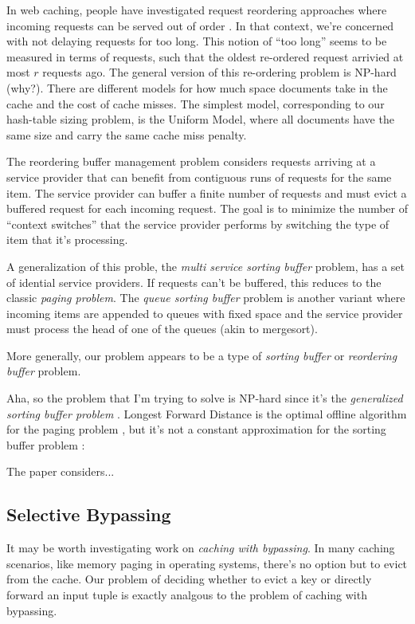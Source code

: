\documentclass[12pt]{article}
\begin{document}
In web caching, people have investigated request reordering approaches where incoming requests can be served out of order \cite{web-caching-new-results}.  In that context, we're concerned with not delaying requests for too long.  This notion of ``too long'' seems to be measured in terms of requests, such that the oldest re-ordered request arrivied at most $r$ requests ago.  The general version of this re-ordering problem is NP-hard (why?).  There are different models for how much space documents take in the cache and the cost of cache misses.  The simplest model, corresponding to our hash-table sizing problem, is the Uniform Model, where all documents have the same size and carry the same cache miss penalty.

The reordering buffer management problem \cite{online-scheduling-for-sorting-buffers} considers requests arriving at a service provider that can benefit from contiguous runs of requests for the same item.  The service provider can buffer a finite number of requests and must evict a buffered request for each incoming request.  The goal is to minimize the number of ``context switches'' that the service provider performs by switching the type of item that it's processing.

A generalization of this proble, the \emph{multi service sorting buffer} problem, has a set of idential service providers.  If requests can't be buffered, this reduces to the classic \emph{paging problem}.  The \emph{queue sorting buffer} problem is another variant where incoming items are appended to queues with fixed space and the service provider must process the head of one of the queues (akin to mergesort).

More generally, our problem appears to be a type of \emph{sorting buffer} or \emph{reordering buffer} problem.

Aha, so the problem that I'm trying to solve is NP-hard since it's the \emph{generalized sorting buffer problem} \cite{sorting-buffer-np-hardness}.
Longest Forward Distance is the optimal offline algorithm for the paging problem \cite{lfd}, but it's not a constant approximation for the sorting buffer problem \cite{sorting-buffer-np-hardness}:

The paper \cite{competitive-reordering-algorithm} considers...



\subsection{Selective Bypassing}
It may be worth investigating work on \emph{caching with bypassing}.  In many caching scenarios, like memory paging in operating systems, there's no option but to evict from the cache.  Our problem of deciding whether to evict a key or directly forward an input tuple is exactly analgous to the problem of caching with bypassing.
\end{document}
